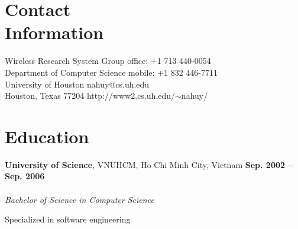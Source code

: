 \documentclass[margin,line]{resume}
\begin{document}
\begin{resume}

    \section{\mysidestyle Contact\\Information}

    Wireless Research System Group                              \hfill office: +1 713 440-0054          \vspace{0mm}\\\vspace{0mm}%
    Department of Computer Science                              \hfill mobile: +1 832 446-7711         \vspace{0mm}\\\vspace{0mm}%
    University of Houston                                       \hfill nahuy@cs.uh.edu
    \vspace{0mm}\\\vspace{0mm}%
    Houston, Texas 77204                                        \hfill http://www2.cs.uh.edu/$\sim$nahuy/ \vspace{0mm}\\\vspace{-4.5mm}%


    \section{\mysidestyle Education}

    \textbf{University of Science}, VNUHCM, Ho Chi Minh City, Vietnam
    \hfill \textbf{ Sep. 2002 -- Sep. 2006}\vspace{-3mm}\\\vspace{-1mm}%
    \\\vspace{1mm}%
    \textsl{Bachelor of Science in Computer Science}
    \begin{list2}
        \item Specialized in software engineering
    \end{list2}\vspace{-1.5mm}


\end{resume}
\end{document}
